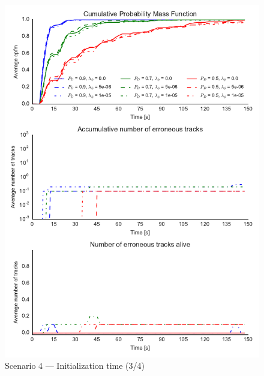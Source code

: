 \begin{figure}
\centering
\includegraphics{Figures/plots/Scenario4_Init-Time(3-4).pdf}
\caption{Scenario 4 --- Initialization time (3/4)}\label{fig:init4_time_3-4}
\end{figure}

